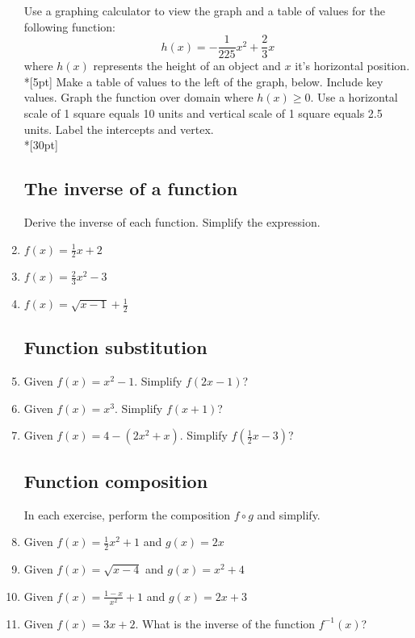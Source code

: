 \documentclass[12pt, oneside]{article}
\begin{document}
\begin{enumerate}
Use a graphing calculator to view the graph and a table of values for the following function:
\[h(x)=-\frac{1}{225}x^2+\frac{2}{3}x\]
where $h(x)$ represents the height of an object and $x$ it's horizontal position.\\*[5pt]
Make a table of values to the left of the graph, below. Include key values. Graph the function over domain where $h(x) \geq 0$. Use a horizontal scale of 1 square equals 10 units and vertical scale of 1 square equals 2.5 units. Label the intercepts and vertex.\\*[30pt]


\subsection*{The inverse of a function}
Derive the inverse of each function. Simplify the expression.
\item   $f(x)=\frac{1}{2}x+2$
\item   $f(x)=\frac{2}{3}x^2-3$
\item   $f(x)=\sqrt{x-1}+\frac{1}{2}$

\subsection*{Function substitution}
\item Given $f(x)=x^2-1$. Simplify $f(2x-1)$?
\item Given $f(x)=x^3$. Simplify $f(x+1)$?
\item Given $f(x)=4-(2x^2+x)$. Simplify $f(\frac{1}{2}x-3)$?

\subsection*{Function composition}
In each exercise, perform the composition $f \circ g$ and simplify.
\item Given $f(x)=\frac{1}{2}x^2+1$ and $g(x)=2x$
\item Given $f(x)=\sqrt{x-4}$ and $g(x)=x^2+4$
\item Given $\displaystyle f(x)=\frac{1-x}{x^2}+1$ and $g(x)=2x+3$

\item Given $f(x)=3x+2$. What is the inverse of the function $f^{-1} (x)$?


\end{enumerate}
\end{document}
